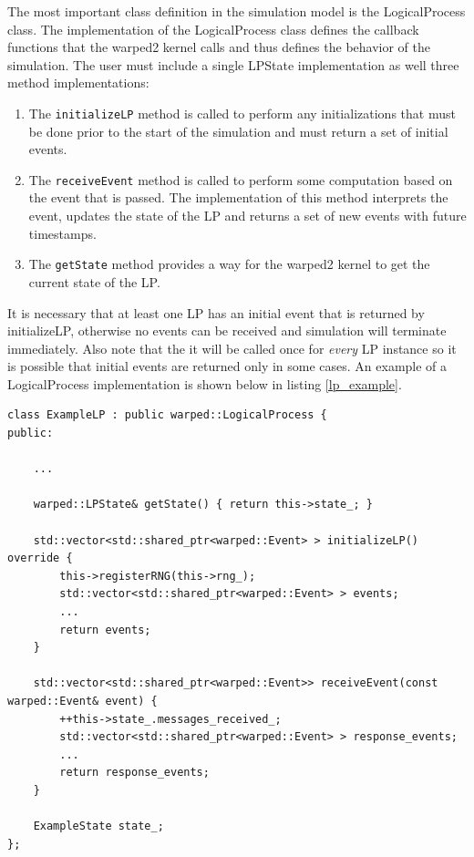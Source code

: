 \documentclass[11pt]{book}
\begin{document}
The most important class definition in the simulation model is the LogicalProcess class.
The implementation of the LogicalProcess class defines the callback functions that the
warped2 kernel calls and thus defines the behavior of the simulation. The user must include
a single LPState implementation as well three method implementations:

\begin{enumerate}
    \item The \texttt{initializeLP} method is called to perform any initializations that must
        be done prior to the start of the simulation and must return a set of initial events.
    \item The \texttt{receiveEvent} method is called to perform some computation based on
        the event that is passed. The implementation of this method interprets the event,
        updates the state of the LP and returns a set of new events with future timestamps.
    \item The \texttt{getState} method provides a way for the warped2 kernel to get the current
        state of the LP.
\end{enumerate}

It is necessary that at least one LP has an initial event that is returned by
initializeLP, otherwise no events can be received and simulation will terminate immediately.
Also note that the it will be called once for \emph{every} LP instance so it is possible that
initial events are returned only in some cases. An example of a LogicalProcess implementation
is shown below in listing \ref{lp_example}.

\begin{lstlisting}[caption=Example \textsc{warped2} LogicalProcess Definition, label=lp_example, float]
class ExampleLP : public warped::LogicalProcess {
public:

    ...

    warped::LPState& getState() { return this->state_; }

    std::vector<std::shared_ptr<warped::Event> > initializeLP() override {
        this->registerRNG(this->rng_);
        std::vector<std::shared_ptr<warped::Event> > events;
        ...
        return events;
    }

    std::vector<std::shared_ptr<warped::Event>> receiveEvent(const warped::Event& event) {
        ++this->state_.messages_received_;
        std::vector<std::shared_ptr<warped::Event> > response_events;
        ...
        return response_events;
    }

    ExampleState state_;
};
\end{lstlisting}
\end{document}
